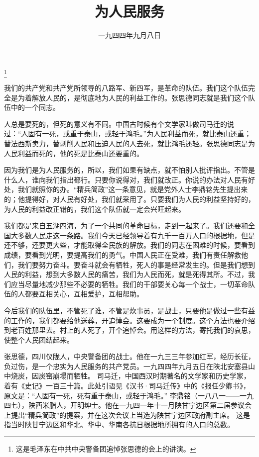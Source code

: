 
\title{为人民服务}
\date{一九四四年九月八日}
\thanks{这是毛泽东在中共中央警备团追悼张思德的会上的讲演。}
\maketitle


我们的共产党和共产党所领导的八路军、新四军，是革命的队伍。我们这个队伍完全是为着解放人民的，是彻底地为人民的利益工作的。张思德同志就是我们这个队伍中的一个同志。

人总是要死的，但死的意义有不同。中国古时候有个文学家叫做司马迁的说过：“人固有一死，或重于泰山，或轻于鸿毛。”为人民利益而死，就比泰山还重；替法西斯卖力，替剥削人民和压迫人民的人去死，就比鸿毛还轻。张思德同志是为人民利益而死的，他的死是比泰山还要重的。

因为我们是为人民服务的，所以，我们如果有缺点，就不怕别人批评指出。不管是什么人，谁向我们指出都行。只要你说得对，我们就改正。你说的办法对人民有好处，我们就照你的办。“精兵简政”这一条意见，就是党外人士李鼎铭先生提出来的；他提得好，对人民有好处，我们就采用了。只要我们为人民的利益坚持好的，为人民的利益改正错的，我们这个队伍就一定会兴旺起来。

我们都是来自五湖四海，为了一个共同的革命目标，走到一起来了。我们还要和全国大多数人民走这一条路。我们今天已经领导着有九千一百万人口的根据地，但是还不够，还要更大些，才能取得全民族的解放。我们的同志在困难的时候，要看到成绩，要看到光明，要提高我们的勇气。中国人民正在受难，我们有责任解救他们，我们要努力奋斗。要奋斗就会有牺牲，死人的事是经常发生的。但是我们想到人民的利益，想到大多数人民的痛苦，我们为人民而死，就是死得其所。不过，我们应当尽量地减少那些不必要的牺牲。我们的干部要关心每一个战士，一切革命队伍的人都要互相关心，互相爱护，互相帮助。

今后我们的队伍里，不管死了谁，不管是炊事员，是战士，只要他是做过一些有益的工作的，我们都要给他送葬，开追悼会。这要成为一个制度。这个方法也要介绍到老百姓那里去。村上的人死了，开个追悼会。用这样的方法，寄托我们的哀思，使整个人民团结起来。


\begin{maonote}
张思德，四川仪陇人，中央警备团的战士。他在一九三三年参加红军，经历长征，负过伤，是一个忠实为人民服务的共产党员。一九四四年九月五日在陕北安塞县山中烧炭，因炭窑崩塌而牺牲。
司马迁，中国西汉时期著名的文学家和历史学家，着有《史记》一百三十篇。此处引语见《汉书·司马迁传》中的《报任少卿书》，原文是：“人固有一死，死有重于泰山，或轻于鸿毛。”
李鼎铭（一八八一——一九四七），陕西米脂人，开明绅士。他在一九四一年十一月陕甘宁边区第二届参议会上提出“精兵简政”的提案，并在这次会议上当选为陕甘宁边区政府副主席。
这是指当时陕甘宁边区和华北、华中、华南各抗日根据地所拥有的人口的总数。
\end{maonote}

